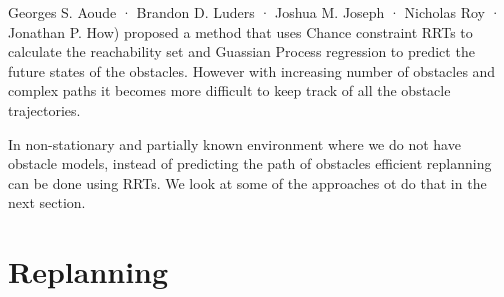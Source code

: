 \documentclass[MTech]{iitmdiss}
\begin{document}
Georges S. Aoude · Brandon D. Luders · Joshua M. Joseph · Nicholas Roy · Jonathan P. How) proposed a method that uses Chance constraint RRTs to calculate the reachability set and Guassian Process regression to predict the future states of the obstacles. However with increasing number of obstacles and complex paths it becomes more difficult to keep track of all the obstacle trajectories. 

In non-stationary and partially known environment where we do not have obstacle models, instead of predicting the path of obstacles efficient replanning can be done using RRTs. We look at some of the approaches ot do that in the next section.

 \section{Replanning}
 
\end{document}

